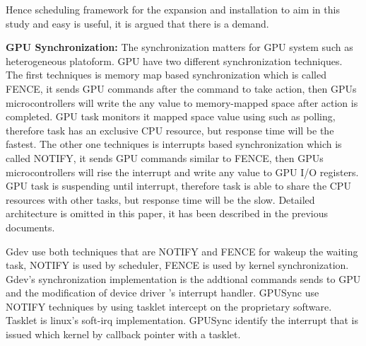 Hence scheduling framework for the expansion and installation to aim in this study and easy is useful,
it is argued that there is a demand.



\textbf{GPU Synchronization:}
The synchronization matters for GPU system such as heterogeneous platoform.
GPU have two different synchronization techniques.
The first techniques is memory map based synchronization which is called FENCE,
it sends GPU commands after the command to take action,
then GPUs microcontrollers will write the any value to memory-mapped space after action is completed.
GPU task monitors it mapped space value using such as polling,
therefore task has an exclusive CPU resource,
but response time will be the fastest.
The other one techniques is interrupts based synchronization which is called NOTIFY,
it sends GPU commands similar to FENCE,
then GPUs microcontrollers will rise the interrupt and write any value to GPU I/O registers.
GPU task is suspending until interrupt,
therefore task is able to share the CPU resources with other tasks,
but response time will be the slow. Detailed architecture is omitted in this paper,
it has been described in the previous documents\cite{kato:timegprah, kato:gdev, fujii:apsys2013}.

Gdev use both techniques that are NOTIFY and FENCE for wakeup the waiting task,
NOTIFY is used by scheduler, FENCE is used by kernel synchronization. 
Gdev’s synchronization implementation is the addtional commands sends to GPU and the modification of device driver ’s interrupt handler.
GPUSync use NOTIFY techniques by using tasklet intercept\cite{elliott2012robust} on the proprietary software.
Tasklet is linux’s soft-irq implementation.
GPUSync identify the interrupt that is issued which kernel by callback pointer with a tasklet.

